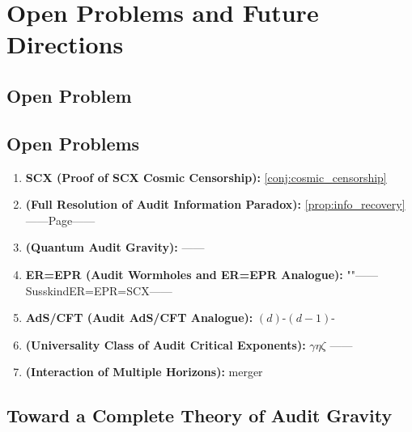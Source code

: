 \documentclass[12pt,a4paper]{article}
\theoremstyle{remark}
\begin{document}
\section{}
\section{Open Problems and Future Directions}

\subsection{Open Problem}
\subsection{Open Problems}

\begin{enumerate}[label=\textbf{OP\arabic*}, leftmargin=*]

    \item \textbf{SCX (Proof of SCX Cosmic Censorship):} \ref{conj:cosmic_censorship}

    \item \textbf{ (Full Resolution of Audit Information Paradox):} \ref{prop:info_recovery}——Page——

    \item \textbf{ (Quantum Audit Gravity):} ——

    \item \textbf{ER=EPR (Audit Wormholes and ER=EPR Analogue):} ""——SusskindER=EPR=SCX——

    \item \textbf{AdS/CFT (Audit AdS/CFT Analogue):} $(d)$-$(d-1)$-

    \item \textbf{ (Universality Class of Audit Critical Exponents):}  $\gamma$$\eta$$\zeta$ ——

    \item \textbf{ (Interaction of Multiple Horizons):} merger

\end{enumerate}

\subsection{}
\subsection{Toward a Complete Theory of Audit Gravity}
\end{document}
